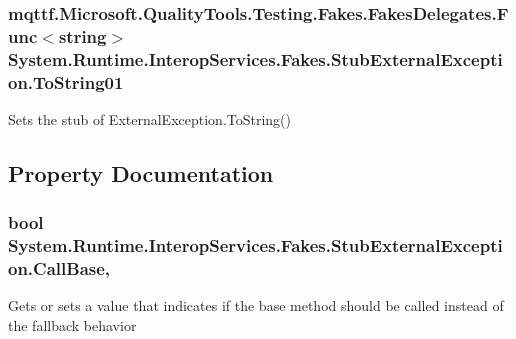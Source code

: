 \hypertarget{class_system_1_1_runtime_1_1_interop_services_1_1_fakes_1_1_stub_external_exception_ad557bf5f906481b057258114a7b5741f}{
\subsubsection[{To\-String01}]{\setlength{\rightskip}{0pt plus 5cm}mqttf.\-Microsoft.\-Quality\-Tools.\-Testing.\-Fakes.\-Fakes\-Delegates.\-Func$<$string$>$ System.\-Runtime.\-Interop\-Services.\-Fakes.\-Stub\-External\-Exception.\-To\-String01}}\label{class_system_1_1_runtime_1_1_interop_services_1_1_fakes_1_1_stub_external_exception_ad557bf5f906481b057258114a7b5741f}


Sets the stub of External\-Exception.\-To\-String()



\subsection{Property Documentation}
\hypertarget{class_system_1_1_runtime_1_1_interop_services_1_1_fakes_1_1_stub_external_exception_aea88704e5f1bc509685298b99cedcf32}{
\subsubsection[{Call\-Base}]{\setlength{\rightskip}{0pt plus 5cm}bool System.\-Runtime.\-Interop\-Services.\-Fakes.\-Stub\-External\-Exception.\-Call\-Base\hspace{0.3cm}{\ttfamily [get]}, {\ttfamily [set]}}}\label{class_system_1_1_runtime_1_1_interop_services_1_1_fakes_1_1_stub_external_exception_aea88704e5f1bc509685298b99cedcf32}


Gets or sets a value that indicates if the base method should be called instead of the fallback behavior

